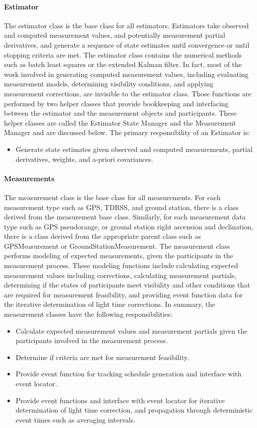 \paragraph{Estimator}  The estimator class is the base class for all estimators.  Estimators
take observed and computed measurement values, and potentially measurement partial derivatives, and
generate a sequence of state estimates until convergence or until stopping criteria are met.  The
estimator class contains the numerical methods such as batch least squares or the extended Kalman
filter.  In fact, most of the work involved in generating computed measurement values, including
evaluating measurement models, determining visibility conditions, and applying measurement
corrections, are invisible to the estimator class.  Those functions are performed by two helper
classes that provide bookkeeping and interfacing between the estimator and the measurement objects
and participants.  These helper classes are called the Estimator State Manager and the Measurement
Manager and are discussed below.  The primary responsibility of an Estimator is:
\begin{itemize}
\item Generate state estimates given observed and computed measurements, partial derivatives,
weights, and a-priori covariances.
\end{itemize}

\paragraph{Measurements}  The measurement class is the base class for all measurements.  For each
measurement type such as GPS, TDRSS, and ground station, there is a class derived from the
measurement base class.  Similarly, for each measurement data type such as GPS pseudorange, or
ground station right ascension and declination, there is a class derived from the appropriate parent
class such as GPSMeasurement or GroundStationMeasurement.  The measurement class performs modeling
of expected measurements, given the participants in the measurement process.  These modeling
functions include calculating expected measurement values including corrections, calculating
measurement partials, determining if the states of participants meet visibility and other conditions
that are required for measurement feasibility, and providing event function data for the iterative
determination of light time corrections.  In summary, the measurement classes have the following
responsibilities:
\begin{itemize}
\item Calculate expected measurement values and measurement partials given the participants
involved in the measurement process.
\item Determine if criteria are met for measurement feasibility.
\item Provide event function for tracking schedule generation and interface with event locator.
\item Provide event functions and interface with event locator for iterative determination of light
time correction, and propagation through deterministic event times such as averaging intervals.
\end{itemize}

